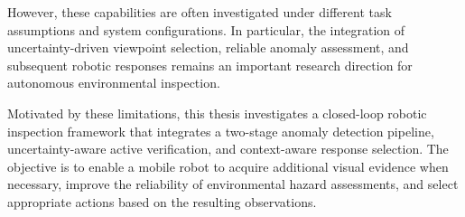 However, these capabilities are often investigated under different task assumptions and system configurations.
In particular, the integration of uncertainty-driven viewpoint selection, reliable anomaly assessment, and subsequent robotic responses remains an important research direction for autonomous environmental inspection.

Motivated by these limitations, this thesis investigates a closed-loop robotic inspection framework that integrates a two-stage anomaly detection pipeline, uncertainty-aware active verification, and context-aware response selection.
The objective is to enable a mobile robot to acquire additional visual evidence when necessary, improve the reliability of environmental hazard assessments, and select appropriate actions based on the resulting observations.